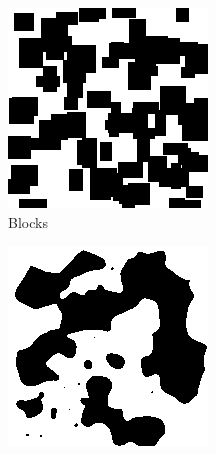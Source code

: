 \documentclass[letterpaper]{article}
\begin{document}
\begin{figure}
    \centering
    \begin{subfigure}[b]{0.2\textwidth}
        \includegraphics[width=\textwidth]{blocks}
        \caption{Blocks}
        \label{fig:blocks}
    \end{subfigure}
    \begin{subfigure}[b]{0.2\textwidth}
        \includegraphics[width=\textwidth]{expMixture}

\end{subfigure}
\end{figure}
\end{document}
